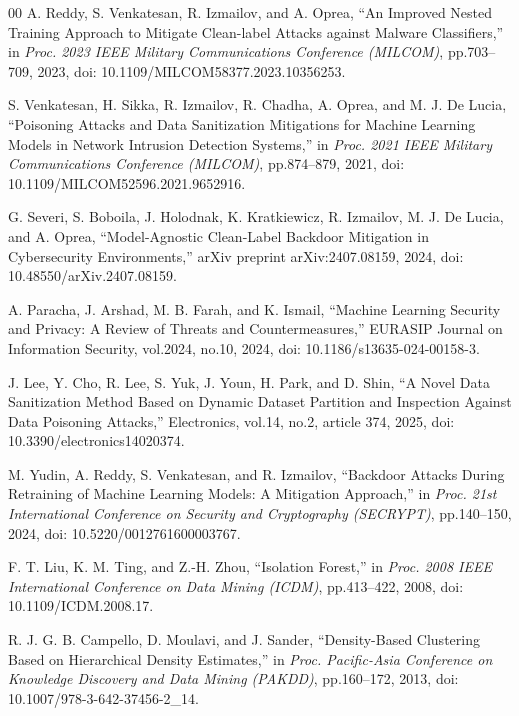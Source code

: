 \begin{thebibliography}{00}
A. Reddy, S. Venkatesan, R. Izmailov, and A. Oprea,
``An Improved Nested Training Approach to Mitigate Clean-label Attacks against Malware Classifiers,''
in \textit{Proc. 2023 IEEE Military Communications Conference (MILCOM)}, pp.703--709, 2023,
doi: 10.1109/MILCOM58377.2023.10356253.

S. Venkatesan, H. Sikka, R. Izmailov, R. Chadha, A. Oprea, and M. J. De Lucia,
``Poisoning Attacks and Data Sanitization Mitigations for Machine Learning Models in Network Intrusion Detection Systems,''
in \textit{Proc. 2021 IEEE Military Communications Conference (MILCOM)}, pp.874--879, 2021,
doi: 10.1109/MILCOM52596.2021.9652916.

G. Severi, S. Boboila, J. Holodnak, K. Kratkiewicz, R. Izmailov, M. J. De Lucia, and A. Oprea,
``Model-Agnostic Clean-Label Backdoor Mitigation in Cybersecurity Environments,''
arXiv preprint arXiv:2407.08159, 2024,
doi: 10.48550/arXiv.2407.08159.

A. Paracha, J. Arshad, M. B. Farah, and K. Ismail,
``Machine Learning Security and Privacy: A Review of Threats and Countermeasures,''
EURASIP Journal on Information Security, vol.2024, no.10, 2024,
doi: 10.1186/s13635-024-00158-3.

J. Lee, Y. Cho, R. Lee, S. Yuk, J. Youn, H. Park, and D. Shin,
``A Novel Data Sanitization Method Based on Dynamic Dataset Partition and Inspection Against Data Poisoning Attacks,''
Electronics, vol.14, no.2, article 374, 2025,
doi: 10.3390/electronics14020374.

M. Yudin, A. Reddy, S. Venkatesan, and R. Izmailov,
``Backdoor Attacks During Retraining of Machine Learning Models: A Mitigation Approach,''
in \textit{Proc. 21st International Conference on Security and Cryptography (SECRYPT)}, pp.140--150, 2024,
doi: 10.5220/0012761600003767.

F. T. Liu, K. M. Ting, and Z.-H. Zhou,
``Isolation Forest,''
in \textit{Proc. 2008 IEEE International Conference on Data Mining (ICDM)}, pp.413--422, 2008,
doi: 10.1109/ICDM.2008.17.

R. J. G. B. Campello, D. Moulavi, and J. Sander,
``Density-Based Clustering Based on Hierarchical Density Estimates,''
in \textit{Proc. Pacific-Asia Conference on Knowledge Discovery and Data Mining (PAKDD)}, pp.160--172, 2013,
doi: 10.1007/978-3-642-37456-2\_14.


\end{thebibliography}
